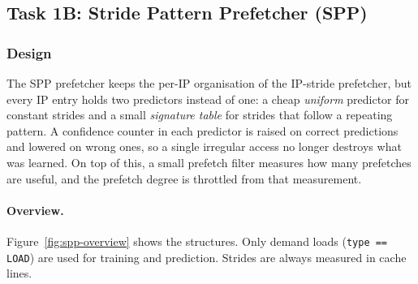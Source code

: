 \documentclass[11pt,a4paper]{article}
\begin{document}
\subsection{Task 1B: Stride Pattern Prefetcher (SPP)}
\label{sec:task1b}

\subsubsection{Design}
The SPP prefetcher keeps the per-IP organisation of the IP-stride prefetcher, but every IP entry
holds two predictors instead of one: a cheap \emph{uniform} predictor for constant strides and a
small \emph{signature table} for strides that follow a repeating pattern. A confidence counter in each
predictor is raised on correct predictions and lowered on wrong ones, so a single irregular access
no longer destroys what was learned. On top of this, a small prefetch filter measures how many
prefetches are useful, and the prefetch degree is throttled from that measurement.

\paragraph{Overview.}
Figure~\ref{fig:spp-overview} shows the structures. Only demand loads (\texttt{type == LOAD}) are
used for training and prediction. Strides are always measured in cache lines.
\end{document}
